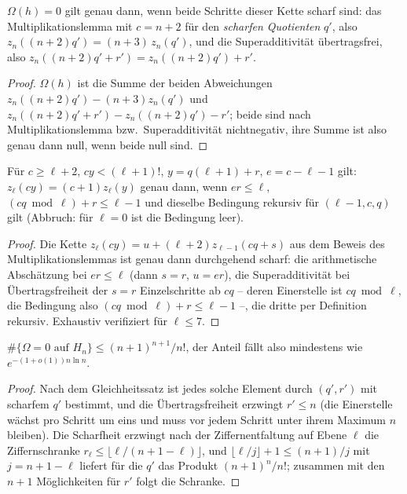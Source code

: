 \begin{satz}
$\Omega(h)=0$ gilt genau dann, wenn beide Schritte dieser Kette
scharf sind: das Multiplikationslemma mit $c=n{+}2$ für den
\emph{scharfen Quotienten} $q'$, also
$z_n((n{+}2)q')=(n{+}3)\,z_n(q')$, und die Superadditivität
übertragsfrei, also $z_n((n{+}2)q'+r')=z_n((n{+}2)q')+r'$.
\end{satz}

\begin{proof}
$\Omega(h)$ ist die Summe der beiden Abweichungen
$z_n((n{+}2)q')-(n{+}3)z_n(q')$ und
$z_n((n{+}2)q'+r')-z_n((n{+}2)q')-r'$; beide sind nach
Multiplikationslemma bzw.\ Superadditivität nichtnegativ, ihre
Summe ist also genau dann null, wenn beide null sind.
\end{proof}

\begin{satz}
Für $c\ge\ell+2$, $cy<(\ell+1)!$, $y=q(\ell+1)+r$, $e=c-\ell-1$
gilt: $z_\ell(cy)=(c{+}1)z_\ell(y)$ genau dann, wenn $er\le\ell$,
$(cq\bmod\ell)+r\le\ell-1$ und dieselbe Bedingung rekursiv für
$(\ell{-}1,c,q)$ gilt (Abbruch: für $\ell=0$ ist die Bedingung
leer).
\end{satz}

\begin{proof}
Die Kette $z_\ell(cy)=u+(\ell+2)z_{\ell-1}(cq+s)$ aus dem Beweis
des Multiplikationslemmas ist genau dann durchgehend scharf: die
arithmetische Abschätzung bei $er\le\ell$ (dann $s=r$, $u=er$),
die Superadditivität bei Übertragsfreiheit der $s=r$
Einzelschritte ab $cq$ -- deren Einerstelle ist $cq\bmod\ell$, die
Bedingung also $(cq\bmod\ell)+r\le\ell-1$ --, die dritte per
Definition rekursiv. Exhaustiv verifiziert für $\ell\le7$.
\end{proof}

\begin{satz}
$\#\{\Omega=0\text{ auf }H_n\}\le(n{+}1)^{n+1}/n!$, der Anteil
fällt also mindestens wie $e^{-(1+o(1))n\ln n}$.
\end{satz}

\begin{proof}
Nach dem Gleichheitssatz ist jedes solche Element durch $(q',r')$
mit scharfem $q'$ bestimmt, und die Übertragsfreiheit erzwingt
$r'\le n$ (die Einerstelle wächst pro Schritt um eins und muss vor
jedem Schritt unter ihrem Maximum $n$ bleiben). Die Scharfheit
erzwingt nach der Ziffernentfaltung auf Ebene $\ell$ die
Ziffernschranke $r_\ell\le\lfloor\ell/(n{+}1{-}\ell)\rfloor$, und
$\lfloor\ell/j\rfloor+1\le(n{+}1)/j$ mit $j=n{+}1{-}\ell$ liefert
für die $q'$ das Produkt $(n{+}1)^n/n!$; zusammen mit den $n{+}1$
Möglichkeiten für $r'$ folgt die Schranke.
\end{proof}

